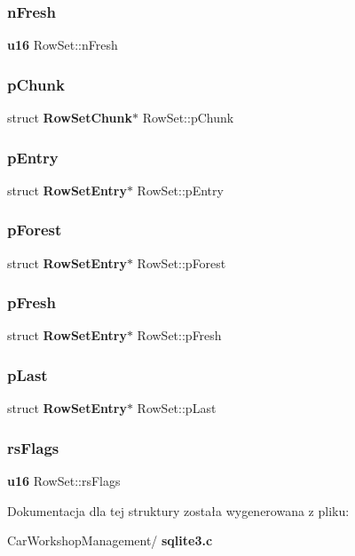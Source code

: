 \subsubsection{nFresh}
{\footnotesize\ttfamily \textbf{ u16} Row\+Set\+::n\+Fresh}

\mbox{\label{struct_row_set_af064f9ec7b1ba820a3d53622bde9d42f}} 
\subsubsection{pChunk}
{\footnotesize\ttfamily struct \textbf{ Row\+Set\+Chunk}$\ast$ Row\+Set\+::p\+Chunk}

\mbox{\label{struct_row_set_a3eccaf69ad7863abae2541a7c0b94e1d}} 
\subsubsection{pEntry}
{\footnotesize\ttfamily struct \textbf{ Row\+Set\+Entry}$\ast$ Row\+Set\+::p\+Entry}

\mbox{\label{struct_row_set_abe7ab16fffbe5992f637d6a17c6342ff}} 
\subsubsection{pForest}
{\footnotesize\ttfamily struct \textbf{ Row\+Set\+Entry}$\ast$ Row\+Set\+::p\+Forest}

\mbox{\label{struct_row_set_a7c4e95bd08ff77135068bb3987be5ca1}} 
\subsubsection{pFresh}
{\footnotesize\ttfamily struct \textbf{ Row\+Set\+Entry}$\ast$ Row\+Set\+::p\+Fresh}

\mbox{\label{struct_row_set_a040c4b798e6f20d20aa99a45e93b2079}} 
\subsubsection{pLast}
{\footnotesize\ttfamily struct \textbf{ Row\+Set\+Entry}$\ast$ Row\+Set\+::p\+Last}

\mbox{\label{struct_row_set_abfbd103e329e88d0a09ca5a7c9bbd225}} 
\subsubsection{rsFlags}
{\footnotesize\ttfamily \textbf{ u16} Row\+Set\+::rs\+Flags}



Dokumentacja dla tej struktury została wygenerowana z pliku\+:\begin{DoxyCompactItemize}
\item 
Car\+Workshop\+Management/\textbf{ sqlite3.\+c}\end{DoxyCompactItemize}
